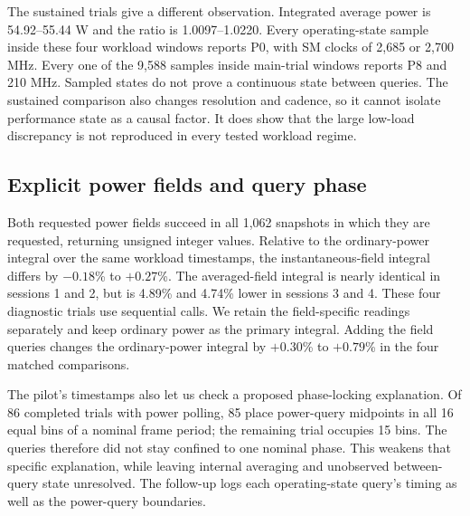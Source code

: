 \documentclass[10pt,conference]{IEEEtran}
\begin{document}
The sustained trials give a different observation. Integrated average power is 54.92--55.44 W and the ratio is 1.0097--1.0220. Every operating-state sample inside these four workload windows reports P0, with SM clocks of 2,685 or 2,700 MHz. Every one of the 9,588 samples inside main-trial windows reports P8 and 210 MHz. Sampled states do not prove a continuous state between queries. The sustained comparison also changes resolution and cadence, so it cannot isolate performance state as a causal factor. It does show that the large low-load discrepancy is not reproduced in every tested workload regime.

\begin{table}[t]
\centering
\caption{Absolute estimates and controls. Each row summarizes four trials as median [minimum, maximum]. B has no in-window power polling, so no power integral or ratio is reported. ``Full, static'' is the main-policy baseline under P; idle and copy controls use nominal 100-ms polling. Sustained is uncapped 1920$\times$1080 rendering under P and is not a matched optimization comparison.}
\label{tab:controls}

\end{table}

\subsection{Explicit power fields and query phase}
Both requested power fields succeed in all 1,062 snapshots in which they are requested, returning unsigned integer values. Relative to the ordinary-power integral over the same workload timestamps, the instantaneous-field integral differs by $-0.18$\% to $+0.27$\%. The averaged-field integral is nearly identical in sessions 1 and 2, but is 4.89\% and 4.74\% lower in sessions 3 and 4. These four diagnostic trials use sequential calls. We retain the field-specific readings separately and keep ordinary power as the primary integral. Adding the field queries changes the ordinary-power integral by $+0.30$\% to $+0.79$\% in the four matched comparisons.

The pilot's timestamps also let us check a proposed phase-locking explanation. Of 86 completed trials with power polling, 85 place power-query midpoints in all 16 equal bins of a nominal frame period; the remaining trial occupies 15 bins. The queries therefore did not stay confined to one nominal phase. This weakens that specific explanation, while leaving internal averaging and unobserved between-query state unresolved. The follow-up logs each operating-state query's timing as well as the power-query boundaries.
\end{document}
